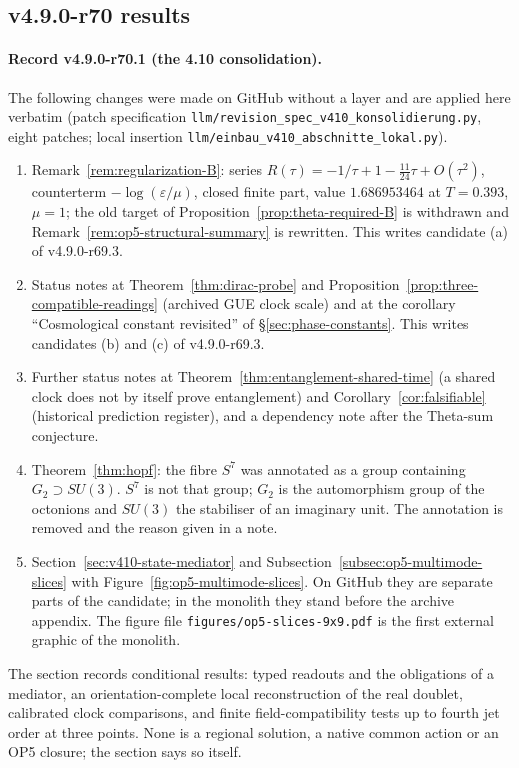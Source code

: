 \subsection*{v4.9.0-r70 results}
\label{subsec:v490-r70-results}

\paragraph{Record v4.9.0-r70.1 (the 4.10 consolidation).}
The following changes were made on GitHub without a layer and are applied here verbatim (patch specification
\texttt{llm/revision\_spec\_v410\_konsolidierung.py}, eight patches; local insertion \texttt{llm/einbau\_v410\_abschnitte\_lokal.py}).
\begin{enumerate}[leftmargin=2em]
\item[(a)] Remark~\ref{rem:regularization-B}: series \(R(\tau)=-1/\tau+1-\tfrac{11}{24}\tau+O(\tau^2)\), counterterm \(-\log(\varepsilon/\mu)\), closed
finite part, value \(1.686953464\) at \(T=0.393\), \(\mu=1\); the old target of Proposition~\ref{prop:theta-required-B} is withdrawn and
Remark~\ref{rem:op5-structural-summary} is rewritten.  This writes candidate (a) of v4.9.0-r69.3.
\item[(b)] Status notes at Theorem~\ref{thm:dirac-probe} and Proposition~\ref{prop:three-compatible-readings} (archived GUE clock scale) and at the
corollary ``Cosmological constant revisited'' of \S\ref{sec:phase-constants}.  This writes candidates (b) and (c) of v4.9.0-r69.3.
\item[(c)] Further status notes at Theorem~\ref{thm:entanglement-shared-time} (a shared clock does not by itself prove entanglement) and
Corollary~\ref{cor:falsifiable} (historical prediction register), and a dependency note after the Theta-sum conjecture.
\item[(d)] Theorem~\ref{thm:hopf}: the fibre \(S^7\) was annotated as a group containing \(G_2\supset SU(3)\).  \(S^7\) is not that group; \(G_2\) is the
automorphism group of the octonions and \(SU(3)\) the stabiliser of an imaginary unit.  The annotation is removed and the reason given in a note.
\item[(e)] Section~\ref{sec:v410-state-mediator} and Subsection~\ref{subsec:op5-multimode-slices} with Figure~\ref{fig:op5-multimode-slices}.  On GitHub they
are separate parts of the candidate; in the monolith they stand before the archive appendix.  The figure file \texttt{figures/op5-slices-9x9.pdf} is the
first external graphic of the monolith.
\end{enumerate}
The section records conditional results: typed readouts and the obligations of a mediator, an orientation-complete local reconstruction of the
real doublet, calibrated clock comparisons, and finite field-compatibility tests up to fourth jet order at three points.  None is a regional
solution, a native common action or an OP5 closure; the section says so itself.

